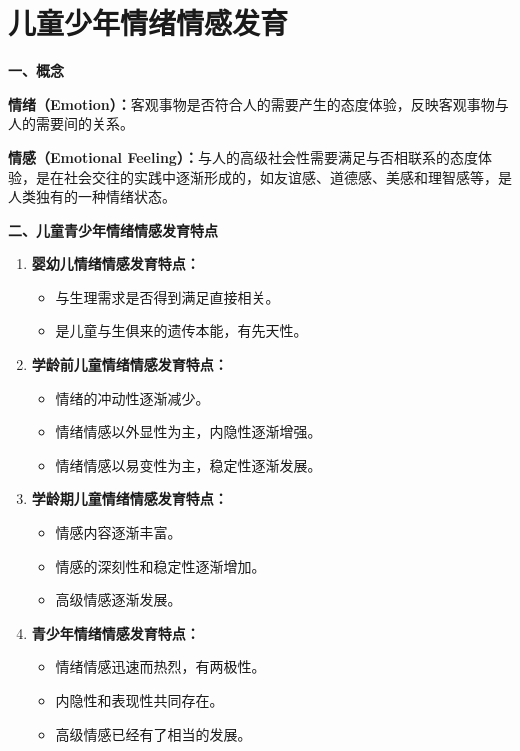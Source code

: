 \section{儿童少年情绪情感发育}

\begin{defbox}
\textbf{一、概念}

\textbf{情绪（Emotion）：}客观事物是否符合人的需要产生的态度体验，反映客观事物与人的需要间的关系。

\textbf{情感（Emotional Feeling）：}与人的高级社会性需要满足与否相联系的态度体验，是在社会交往的实践中逐渐形成的，如友谊感、道德感、美感和理智感等，是人类独有的一种情绪状态。

\textbf{二、儿童青少年情绪情感发育特点}

\begin{enumerate}[leftmargin=*]
    \item \textbf{婴幼儿情绪情感发育特点：}
    \begin{itemize}[leftmargin=*]
        \item 与生理需求是否得到满足直接相关。
        \item 是儿童与生俱来的遗传本能，有先天性。
    \end{itemize}

    \item \textbf{学龄前儿童情绪情感发育特点：}
    \begin{itemize}[leftmargin=*]
        \item 情绪的冲动性逐渐减少。
        \item 情绪情感以外显性为主，内隐性逐渐增强。
        \item 情绪情感以易变性为主，稳定性逐渐发展。
    \end{itemize}

    \item \textbf{学龄期儿童情绪情感发育特点：}
    \begin{itemize}[leftmargin=*]
        \item 情感内容逐渐丰富。
        \item 情感的深刻性和稳定性逐渐增加。
        \item 高级情感逐渐发展。
    \end{itemize}

    \item \textbf{青少年情绪情感发育特点：}
    \begin{itemize}[leftmargin=*]
        \item 情绪情感迅速而热烈，有两极性。
        \item 内隐性和表现性共同存在。
        \item 高级情感已经有了相当的发展。
    \end{itemize}
\end{enumerate}
\end{defbox}

